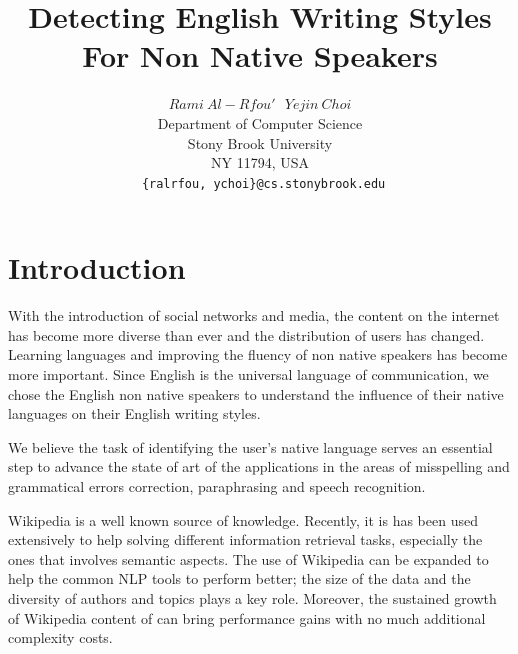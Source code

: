 \documentclass[10pt,a5paper,twoside]{article}
\title{Detecting English Writing Styles For Non Native Speakers}
\author{$Rami~Al-Rfou'~~~Yejin~Choi$ \\
  Department of Computer Science \\
  Stony Brook University \\
  NY 11794, USA \\
  \texttt{ \{ralrfou, ychoi\}@cs.stonybrook.edu}}
\begin{document}
\maketitle
{}


\newpage

\section{Introduction}
With the introduction of social networks and media, the content on the internet 
has become more diverse than ever and the distribution of users has changed.
Learning languages and improving the fluency of non native speakers has
become more important. Since English is the universal language of communication, we chose the English
non native speakers to understand the influence of their
native languages on their English writing styles.

We believe the task of identifying the user's native language serves an essential
step to advance the state of art of the applications in the areas of misspelling and grammatical errors
correction, paraphrasing and speech recognition.

Wikipedia is a well known source of knowledge. Recently, it is has been used extensively
to help solving different information retrieval tasks, especially the ones
that involves semantic aspects\cite{Milne08aneffective}. The use of Wikipedia can be expanded to help the
common NLP tools to perform better; the size of the data and the diversity of
authors and topics plays a key role. Moreover, the sustained growth of Wikipedia
content of can bring performance gains with no much additional complexity costs.
\end{document}

